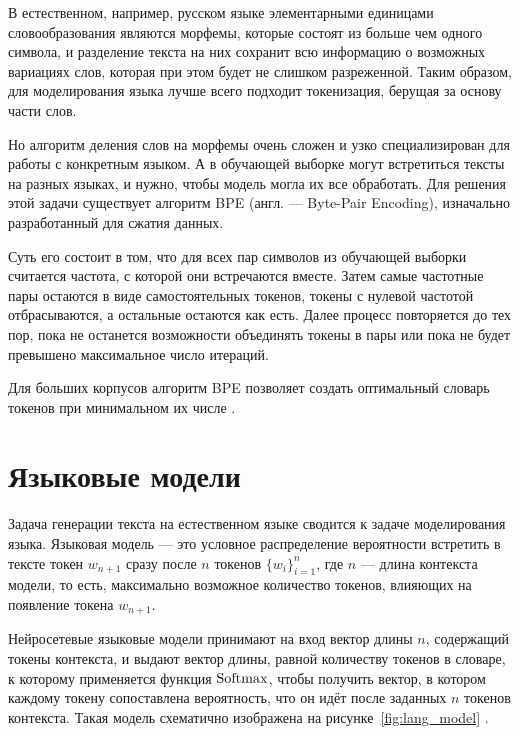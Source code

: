В естественном, например, русском языке элементарными единицами словообразования являются морфемы, которые состоят из больше чем одного символа, и разделение текста на них сохранит всю информацию о возможных вариациях слов, которая при этом будет не слишком разреженной. Таким образом, для моделирования языка лучше всего подходит токенизация, берущая за основу части слов.

Но алгоритм деления слов на морфемы очень сложен и узко специализирован для работы с конкретным языком. А в обучающей выборке могут встретиться тексты на разных языках, и нужно, чтобы модель могла их все обработать. Для решения этой задачи существует алгоритм BPE (англ. --- Byte-Pair Encoding), изначально разработанный для сжатия данных.

Суть его состоит в том, что для всех пар символов из обучающей выборки считается частота, с которой они встречаются вместе. Затем самые частотные пары остаются в виде самостоятельных токенов, токены с нулевой частотой отбрасываются, а остальные остаются как есть. Далее процесс повторяется до тех пор, пока не останется возможности объединять токены в пары или пока не будет превышено максимальное число итераций.

Для больших корпусов алгоритм BPE позволяет создать оптимальный словарь токенов при минимальном их числе \cite{art:bpe}.

\section{Языковые модели}

Задача генерации текста на естественном языке сводится к задаче моделирования языка. Языковая модель --- это условное распределение вероятности встретить в тексте токен $w_{n+1}$ сразу после $n$ токенов $\{w_i\}_{i=1}^n$, где $n$ --- длина контекста модели, то есть, максимально возможное количество токенов, влияющих на появление токена $w_{n+1}$.

Нейросетевые языковые модели принимают на вход вектор длины $n$, содержащий токены контекста, и выдают вектор длины, равной количеству токенов в словаре, к которому применяется функция $\operatorname{Softmax}$, чтобы получить вектор, в котором каждому токену сопоставлена вероятность, что он идёт после заданных $n$ токенов контекста. Такая модель схематично изображена на рисунке \ref*{fig:lang_model} \cite{art:lang_models}.

